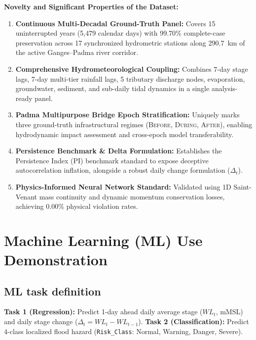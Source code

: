 \documentclass[11pt,a4paper]{article}
\begin{document}
\textbf{Novelty and Significant Properties of the Dataset:}
\begin{enumerate}[leftmargin=16pt,itemsep=1pt,parsep=0pt]
  \item \textbf{Continuous Multi-Decadal Ground-Truth Panel:} Covers 15 uninterrupted years (5,479 calendar days) with 99.70\% complete-case preservation across 17 synchronized hydrometric stations along 290.7~km of the active Ganges--Padma river corridor.
  \item \textbf{Comprehensive Hydrometeorological Coupling:} Combines 7-day stage lags, 7-day multi-tier rainfall lags, 5 tributary discharge nodes, evaporation, groundwater, sediment, and sub-daily tidal dynamics in a single analysis-ready panel.
  \item \textbf{Padma Multipurpose Bridge Epoch Stratification:} Uniquely marks three ground-truth infrastructural regimes (\textsc{Before}, \textsc{During}, \textsc{After}), enabling hydrodynamic impact assessment and cross-epoch model transferability.
  \item \textbf{Persistence Benchmark \& Delta Formulation:} Establishes the Persistence Index ($\text{PI}$) benchmark standard to expose deceptive autocorrelation inflation, alongside a robust daily change formulation ($\Delta_t$).
  \item \textbf{Physics-Informed Neural Network Standard:} Validated using 1D Saint-Venant mass continuity and dynamic momentum conservation losses, achieving 0.00\% physical violation rates.
\end{enumerate}

\clearpage

\section{Machine Learning (ML) Use Demonstration}

\subsection{ML task definition}
\textbf{Task 1 (Regression):} Predict 1-day ahead daily average stage ($WL_{t}$, mMSL) and daily stage change ($\Delta_t = WL_t - WL_{t-1}$). \textbf{Task 2 (Classification):} Predict 4-class localized flood hazard (\texttt{Risk\_Class}: Normal, Warning, Danger, Severe).
\end{document}
